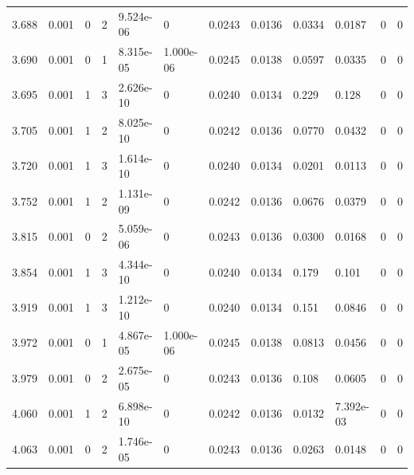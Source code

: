 \documentclass[preview]{standalone}
\begin{document}
{{{\begin{tabular}{L{1.2cm}C{1.2cm} C{0.3cm}C{0.5cm} C{1.4cm}C{1.4cm} C{1.4cm}C{1.4cm} C{1.6cm}C{1.6cm} C{1.6cm}C{1.6cm}}
  3.688  &  0.001  & 0     &  2 &  9.524e-06  & 0  &  0.0243&   0.0136& 0.0334 & 0.0187   &  0 & 0  \\ 
  3.690  &  0.001  & 0     &  1 &  8.315e-05  & 1.000e-06  &  0.0245&   0.0138& 0.0597 & 0.0335   &  0 & 0  \\ 
  3.695  &  0.001  & 1     &  3 &  2.626e-10  & 0  &  0.0240&   0.0134& 0.229 & 0.128   &  0 & 0  \\ 
  3.705  &  0.001  & 1     &  2 &  8.025e-10  & 0  &  0.0242&   0.0136& 0.0770 & 0.0432   &  0 & 0  \\ 
  3.720  &  0.001  & 1     &  3 &  1.614e-10  & 0  &  0.0240&   0.0134& 0.0201 & 0.0113   &  0 & 0  \\ 
  3.752  &  0.001  & 1     &  2 &  1.131e-09  & 0  &  0.0242&   0.0136& 0.0676 & 0.0379   &  0 & 0  \\ 
  3.815  &  0.001  & 0     &  2 &  5.059e-06  & 0  &  0.0243&   0.0136& 0.0300 & 0.0168   &  0 & 0  \\ 
  3.854  &  0.001  & 1     &  3 &  4.344e-10  & 0  &  0.0240&   0.0134& 0.179 & 0.101   &  0 & 0  \\ 
  3.919  &  0.001  & 1     &  3 &  1.212e-10  & 0  &  0.0240&   0.0134& 0.151 & 0.0846   &  0 & 0  \\ 
  3.972  &  0.001  & 0     &  1 &  4.867e-05  & 1.000e-06  &  0.0245&   0.0138& 0.0813 & 0.0456   &  0 & 0  \\ 
  3.979  &  0.001  & 0     &  2 &  2.675e-05  & 0  &  0.0243&   0.0136& 0.108 & 0.0605   &  0 & 0  \\ 
  4.060  &  0.001  & 1     &  2 &  6.898e-10  & 0  &  0.0242&   0.0136& 0.0132 & 7.392e-03   &  0 & 0  \\ 
  4.063  &  0.001  & 0     &  2 &  1.746e-05  & 0  &  0.0243&   0.0136& 0.0263 & 0.0148   &  0 & 0  \\ 
\hline 
\end{tabular} 

}}}
\end{document}
